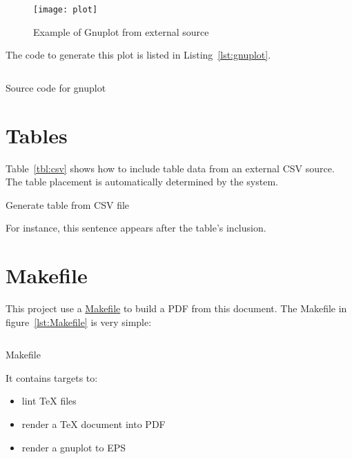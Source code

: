 \documentclass[10pt,a4paper]{article}
\begin{document}
\begin{figure}
  \centering
  \texttt{[image: plot]}
  \caption{Example of Gnuplot from external source\label{fig:gnuplot}}
\end{figure}
The code to generate this plot is listed in Listing~\ref{lst:gnuplot}.
\begin{listing}
  \inputminted{gnuplot}{plot.gnuplot}
  \caption{Source code for gnuplot\label{lst:gnuplot}}
\end{listing}

\sectionbreak{}

\section*{Tables}
Table~\ref{tbl:csv} shows how to include table data from an external CSV
source. The table placement is automatically determined by the system.
\begin{table}
  \begin{center}
    \caption{Generate table from CSV file\label{tbl:csv}}
  \end{center}
\end{table}
For instance, this sentence appears after the table's inclusion.

\lipsum[3]

\sectionbreak{}

\section*{Makefile}

This project use a \href{https://www.gnu.org/software/make/}{Makefile} to build
a PDF from this document. The Makefile in figure~\ref{lst:Makefile} is very
simple:
\begin{listing}
  \inputminted{make}{Makefile}
  \caption{Makefile\label{lst:Makefile}}
\end{listing}
It contains targets to:
\begin{itemize}
  \item lint \TeX{} files
  \item render a \TeX{} document into PDF
  \item render a gnuplot to EPS
\end{itemize}
\end{document}
